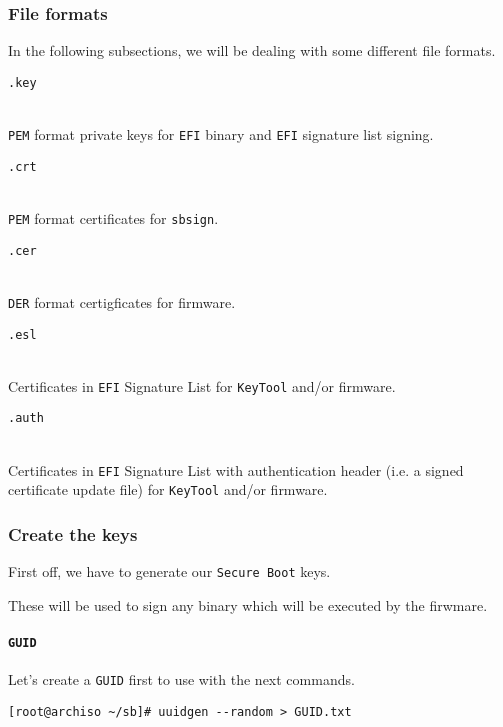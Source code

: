 \documentclass[9pt]{report}
\newenvironment{sidebar}[2]
{\begin{tcolorbox}
        \begin{bf}
            #1
        \end{bf}
    \\#2}
{\end{tcolorbox}}
\begin{document}
\newpage

\hypertarget{x-file-formats}{\subsubsection{File formats}}
In the following subsections, we will be dealing with some different file formats.


\begin{sidebar}{\texttt{.key}}
    \texttt{PEM} format private keys for \texttt{EFI} binary and \texttt{EFI} signature list signing.
\end{sidebar}

\begin{sidebar}{\texttt{.crt}}
    \texttt{PEM} format certificates for \texttt{sbsign}.
\end{sidebar}

\begin{sidebar}{\texttt{.cer}}
    \texttt{DER} format certigficates for firmware.
\end{sidebar}

\begin{sidebar}{\texttt{.esl}}
    Certificates in \texttt{EFI} Signature List for \texttt{KeyTool} and/or firmware.
\end{sidebar}

\begin{sidebar}{\texttt{.auth}}
    Certificates in \texttt{EFI} Signature List with authentication header (i.e. a signed certificate update file) for \texttt{KeyTool} and/or firmware.
\end{sidebar}

\newpage

\hypertarget{x-create-the-keys}{\subsubsection{Create the keys}}

First off, we have to generate our \texttt{Secure Boot} keys.

These will be used to sign any binary which will be executed by the firwmare.

\newpage

\hypertarget{x-guid}{\paragraph{\texttt{GUID}}}
Let’s create a \texttt{GUID} first to use with the next commands.


\begin{verbatim}
[root@archiso ~/sb]# uuidgen --random > GUID.txt
\end{verbatim}
\end{document}
